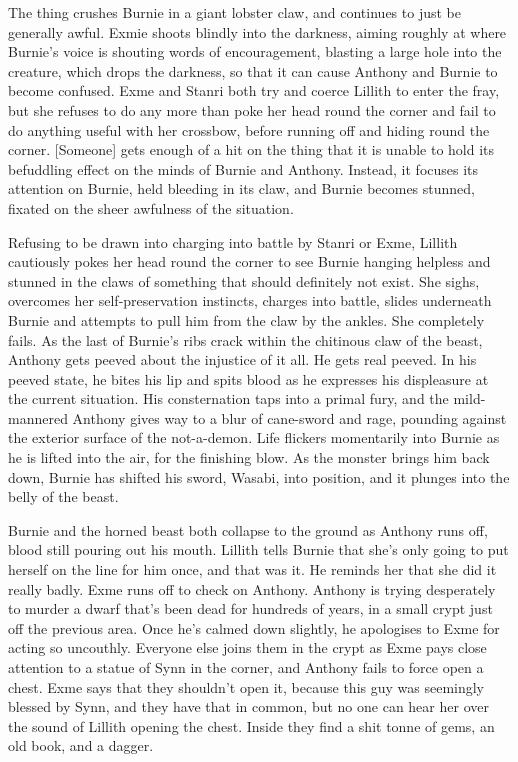 \begin{multicols}{2}
The thing crushes Burnie in a giant lobster claw, and continues to just be generally awful. Exmie shoots blindly into the darkness, aiming roughly at where Burnie’s voice is shouting words of encouragement, blasting a large hole into the creature, which drops the darkness, so that it can cause Anthony and Burnie to become confused. Exme and Stanri both try and coerce Lillith to enter the fray, but she refuses to do any more than poke her head round the corner and fail to do anything useful with her crossbow, before running off and hiding round the corner. [Someone] gets enough of a hit on the thing that it is unable to hold its befuddling effect on the minds of Burnie and Anthony. Instead, it focuses its attention on Burnie, held bleeding in its claw, and Burnie becomes stunned, fixated on the sheer awfulness of the situation.\medskip

Refusing to be drawn into charging into battle by Stanri or Exme, Lillith cautiously pokes her head round the corner to see Burnie hanging helpless and stunned in the claws of something that should definitely not exist. She sighs, overcomes her self-preservation instincts, charges into battle, slides underneath Burnie and attempts to pull him from the claw by the ankles. She completely fails. As the last of Burnie’s ribs crack within the chitinous claw of the beast, Anthony gets peeved about the injustice of it all. He gets real peeved. In his peeved state, he bites his lip and spits blood as he expresses his displeasure at the current situation. His consternation taps into a primal fury, and the mild-mannered Anthony gives way to a blur of cane-sword and rage, pounding against the exterior surface of the not-a-demon. Life flickers momentarily into Burnie as he is lifted into the air, for the finishing blow. As the monster brings him back down, Burnie has shifted his sword, Wasabi, into position, and it plunges into the belly of the beast.\medskip

Burnie and the horned beast both collapse to the ground as Anthony runs off, blood still pouring out his mouth. Lillith tells Burnie that she’s only going to put herself on the line for him once, and that was it. He reminds her that she did it really badly. Exme runs off to check on Anthony. Anthony is trying desperately to murder a dwarf that’s been dead for hundreds of years, in a small crypt just off the previous area. Once he’s calmed down slightly, he apologises to Exme for acting so uncouthly. Everyone else joins them in the crypt as Exme pays close attention to a statue of Synn in the corner, and Anthony fails to force open a chest. Exme says that they shouldn’t open it, because this guy was seemingly blessed by Synn, and they have that in common, but no one can hear her over the sound of Lillith opening the chest. Inside they find a shit tonne of gems, an old book, and a dagger.\medskip


\end{multicols}
